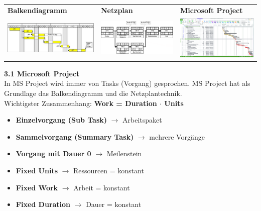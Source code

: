 \begin{table}[h!]
	\begin{tabular}{l l l}
		 \textbf{Balkendiagramm} & \textbf{Netzplan} & \textbf{Microsoft Project} \\
		 \includegraphics[width=6cm]{images/balkendiagramm} & \includegraphics[width=6cm]{images/netzplan}	& \includegraphics[width=6cm]{images/msproject}	 
	\end{tabular}
\end{table}
\textbf{3.1 Microsoft Project}\\
In MS Project wird immer von Tasks (Vorgang) gesprochen. MS Project hat als Grundlage das Balkendiagramm und die Netzplantechnik.\\
Wichtigster Zusammenhang: \textbf{Work = Duration $\cdot$ Units}\\
\begin{multicols}{2}
	\begin{itemize}
		\item \textbf{Einzelvorgang (Sub Task)} $\rightarrow$ Arbeitspaket
		\item \textbf{Sammelvorgang (Summary Task)} \newline $\rightarrow$ mehrere Vorgänge
		\item \textbf{Vorgang mit Dauer 0} $\rightarrow$ Meilenstein	
	\end{itemize}
	\begin{itemize}
		\item \textbf{Fixed Units} $\rightarrow$ Ressourcen = konstant
		\item \textbf{Fixed Work} $\rightarrow$ Arbeit = konstant
		\item \textbf{Fixed Duration} $\rightarrow$ Dauer = konstant
	\end{itemize}
\end{multicols}

